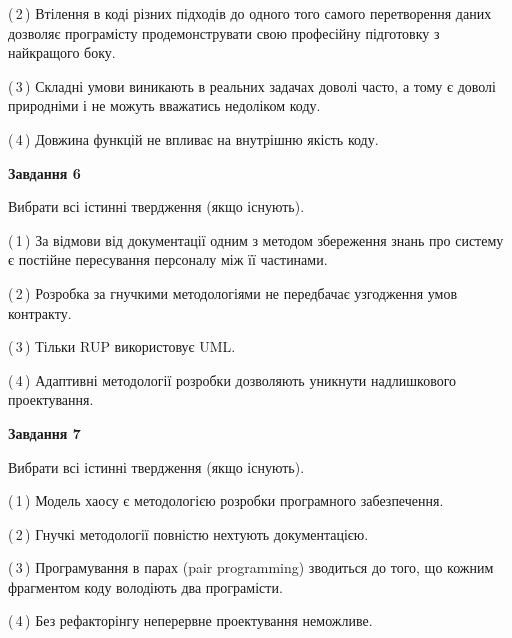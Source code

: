 \documentclass[10pt, ukrainian]{article}
\begin{document}
{\begin {large}
(\,2\,) Втілення в коді різних підходів до одного того самого перетворення даних дозволяє програмісту продемонструвати свою професійну підготовку з найкращого боку. %



(\,3\,) Складні умови виникають в реальних задачах доволі часто, а тому є доволі природніми і не можуть вважатись недоліком коду. %



(\,4\,) Довжина функцій не впливає на внутрішню якість коду. %

\newpage

{\begin {center}\textbf{Завдання 6}\end {center}}\par
Вибрати всі істинні твердження (якщо існують).\par
\vspace{2mm}



(\,1\,) За відмови від документації одним з методом збереження знань про систему є постійне пересування персоналу між її частинами. %



(\,2\,) Розробка за гнучкими методологіями не передбачає узгодження умов контракту. %



(\,3\,) Тільки RUP використовує UML.%



(\,4\,) Адаптивні методології розробки дозволяють уникнути надлишкового проектування. %


{\begin {center}\textbf{Завдання 7}\end {center}}\par
Вибрати всі істинні твердження (якщо існують).\par
\vspace{2mm}



(\,1\,) Модель хаосу є методологією розробки програмного забезпечення. %



(\,2\,) Гнучкі методології повністю нехтують документацією. %



(\,3\,) Програмування в парах (pair programming) зводиться до того, що кожним фрагментом коду володіють два програмісти. %



(\,4\,) Без рефакторінгу неперервне проектування неможливе. %



\end{large}}
\end{document}
